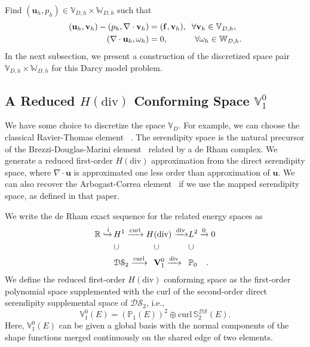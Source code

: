 Find $(\mathbf{u}_h,p_h) \in \mathbb{V}_{D,h} \times \mathbb{W}_{D,h}$ such that
\begin{equation}\label{eq:hdivwekamodel_dis}
		  \begin{aligned}
					 (\mathbf{u}_h, \mathbf{v}_h) - (p_h, \nabla \cdot \mathbf{v}_h) &= (\mathbf{f},\mathbf{v}_h), \hspace{0.2cm} \forall \mathbf{v}_h \in \mathbb{V}_{D,h},\\
					 (\nabla \cdot \mathbf{u}_h, \omega_h) &= 0, \hspace{1.15cm} \forall \omega_h \in \mathbb{W}_{D,h}.
		  \end{aligned}
\end{equation}
In the next subsection, we present a construction of the discretized space pair $\mathbb{V}_{D,h} \times \mathbb{W}_{D,h}$ for this Darcy model problem.

\subsection{A Reduced $H(\text{div})$ Conforming Space $\mathbb{V}_1^{0}$}
\label{sec:reducedHdiv}
We have some choice to discretize the space $\mathbb{V}_D$.
For example, we can choose the classical Ravier-Thomas element 
~\cite{10.1007/BFb0064470}. The serendipity space is
the natural precursor of the Brezzi-Douglas-Marini element~\cite{BDM} related 
by a de Rham complex.
We generate a reduced first-order $H(\text{div})$ approximation from 
the direct serendipity space, where $\nabla \cdot \mathbf{u}$
is approximated one less order than approximation of $\mathbf{u}$.
We can also recover the Arbogast-Correa element~\cite{doi:10.1137/15M1013705} if we 
use the mapped serendipity space, as defined in that paper.

We write the de Rham exact sequence for the related energy spaces as
\begin{equation}\label{eq:exactsequence}
\begin{alignedat}{5}
&\mathbb{R} \xhookrightarrow[]{\text{i}}\, &&H^1 \xrightarrow[]{\text{curl}} H&&(\text{div}) \xrightarrow[]{\text{div}} &&L^2 && \xrightarrow[]{0} 0\\
&\quad &&\cup                            &&\cup                                     &&\cup &&\quad\\
&\quad &&\mathcal{DS}_2  \xrightarrow[]{\text{curl}} &&\mathbf{V}_1^{0} \xrightarrow[]{\text{div}} &&\mathbb{P}_{0} && \quad.
\end{alignedat}
\end{equation}
We define the reduced first-order $H(\text{div})$ conforming space as the first-order polynomial
space supplemented with the curl of the
second-order direct serendipity supplemental space of $\mathcal{DS}_2$, i.e.,
\begin{equation}\label{eq:defhdiv}
		  \mathbb{V}_1^0(E) = (\mathbb{P}_1(E))^2 \oplus \text{curl}\,\mathbb{S}_2^{\mathcal{DS}}(E).
\end{equation}
Here, $\mathbb{V}_1^0(E)$ can be given a global basis with the normal
components of the shape functions merged continuously on the shared edge of
two elements.

